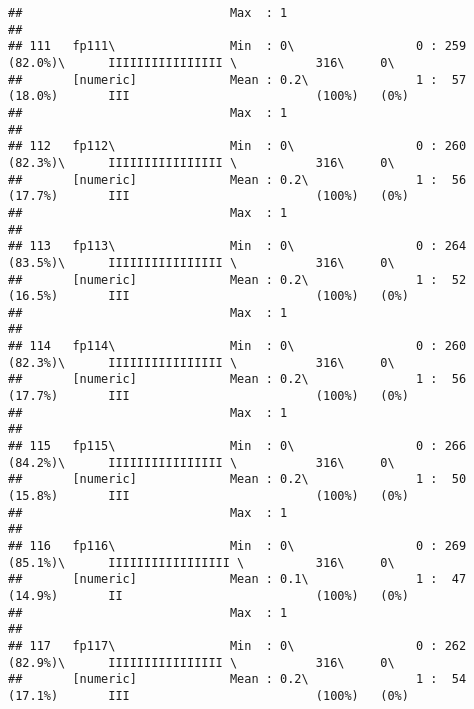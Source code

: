 \documentclass[]{article}
\begin{document}
\begin{verbatim}
##                             Max  : 1                                                                                       
## 
## 111   fp111\                Min  : 0\                 0 : 259 (82.0%)\      IIIIIIIIIIIIIIII \           316\     0\       
##       [numeric]             Mean : 0.2\               1 :  57 (18.0%)       III                          (100%)   (0%)     
##                             Max  : 1                                                                                       
## 
## 112   fp112\                Min  : 0\                 0 : 260 (82.3%)\      IIIIIIIIIIIIIIII \           316\     0\       
##       [numeric]             Mean : 0.2\               1 :  56 (17.7%)       III                          (100%)   (0%)     
##                             Max  : 1                                                                                       
## 
## 113   fp113\                Min  : 0\                 0 : 264 (83.5%)\      IIIIIIIIIIIIIIII \           316\     0\       
##       [numeric]             Mean : 0.2\               1 :  52 (16.5%)       III                          (100%)   (0%)     
##                             Max  : 1                                                                                       
## 
## 114   fp114\                Min  : 0\                 0 : 260 (82.3%)\      IIIIIIIIIIIIIIII \           316\     0\       
##       [numeric]             Mean : 0.2\               1 :  56 (17.7%)       III                          (100%)   (0%)     
##                             Max  : 1                                                                                       
## 
## 115   fp115\                Min  : 0\                 0 : 266 (84.2%)\      IIIIIIIIIIIIIIII \           316\     0\       
##       [numeric]             Mean : 0.2\               1 :  50 (15.8%)       III                          (100%)   (0%)     
##                             Max  : 1                                                                                       
## 
## 116   fp116\                Min  : 0\                 0 : 269 (85.1%)\      IIIIIIIIIIIIIIIII \          316\     0\       
##       [numeric]             Mean : 0.1\               1 :  47 (14.9%)       II                           (100%)   (0%)     
##                             Max  : 1                                                                                       
## 
## 117   fp117\                Min  : 0\                 0 : 262 (82.9%)\      IIIIIIIIIIIIIIII \           316\     0\       
##       [numeric]             Mean : 0.2\               1 :  54 (17.1%)       III                          (100%)   (0%)     

\end{verbatim}
\end{document}
